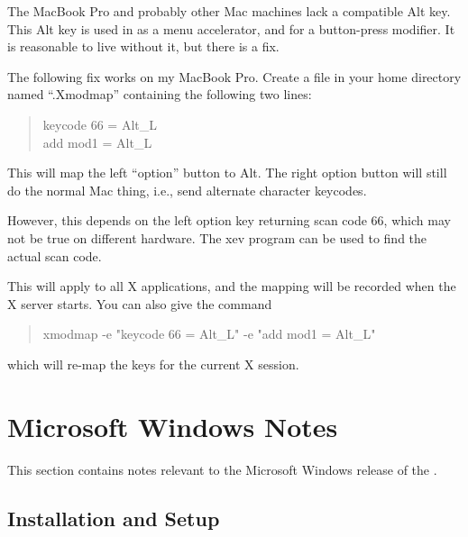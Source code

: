 \begin{itemize}
The MacBook Pro and probably other Mac machines lack a compatible {\kb
Alt} key.  This {\kb Alt} key is used in {\Xic} as a menu accelerator,
and for a button-press modifier.  It is reasonable to live without it,
but there is a fix.

The following fix works on my MacBook Pro.  Create a file in your home
directory named ``{\vt .Xmodmap}'' containing the following two lines:

\begin{quote}\vt
keycode 66 = Alt\_L\\
add mod1 = Alt\_L
\end{quote}

This will map the left ``option'' button to {\kb Alt}.  The right
option button will still do the normal Mac thing, i.e., send alternate
character keycodes.

However, this depends on the left option key returning scan code 66,
which may not be true on different hardware.  The {\vt xev} program
can be used to find the actual scan code.

This will apply to all X applications, and the mapping will be
recorded when the X server starts.  You can also give the command
\begin{quote}
\vt xmodmap -e "keycode 66 = Alt\_L" -e "add mod1 = Alt\_L"
\end{quote}
which will re-map the keys for the current X session.


\section{Microsoft Windows Notes}

This section contains notes relevant to the Microsoft Windows
release of the {\XicTools}.

\subsection{Installation and Setup}

%


\end{itemize}
